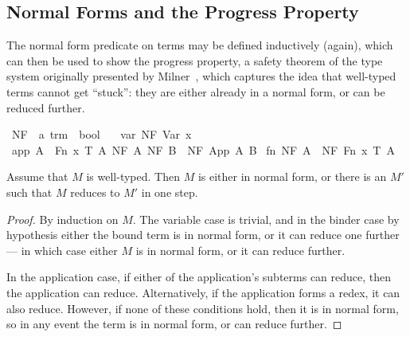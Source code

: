 \subsection{Normal Forms and the Progress Property}
The normal form predicate on terms may be defined inductively (again), which can then be used to show the progress property, a safety theorem of the type system originally presented by Milner~\cite{milner}, which captures the idea that well-typed terms cannot get ``stuck'': they are either already in a normal form, or can be reduced further.

\begin{implementation}
\isamarkupfalse%
\ NF\ {\isacharcolon}{\isacharcolon}\ {\isachardoublequoteopen}{\isacharprime}a\ trm\ {\isasymRightarrow}\ bool{\isachardoublequoteclose}\ \isanewline
\ \ var{\isacharcolon}\ {\isachardoublequoteopen}NF\ {\isacharparenleft}Var\ x{\isacharparenright}{\isachardoublequoteclose}\isanewline
{\isacharbar}\ app{\isacharcolon}\ {\isachardoublequoteopen}{\isasymlbrakk}A\ {\isasymnoteq}\ Fn\ x\ T\ A{\isacharprime}{\isacharsemicolon}\ NF\ A{\isacharsemicolon}\ NF\ B{\isasymrbrakk}\ {\isasymLongrightarrow}\ NF\ {\isacharparenleft}App\ A\ B{\isacharparenright}{\isachardoublequoteclose}\isanewline
{\isacharbar}\ fn{\isacharcolon}\ {\isachardoublequoteopen}NF\ A\ {\isasymLongrightarrow}\ NF\ {\isacharparenleft}Fn\ x\ T\ A{\isacharparenright}{\isachardoublequoteclose}\isanewline
\end{implementation}

\begin{theorem}
\label{theorem:progress}
Assume that \(M\) is well-typed.
Then \(M\) is either in normal form, or there is an \(M'\) such that \(M\) reduces to \(M'\) in one step.
\end{theorem}
\begin{proof}
By induction on \(M\).
The variable case is trivial, and in the binder case by hypothesis either the bound term is in normal form, or it can reduce one further --- in which case either \(M\) is in normal form, or it can reduce further.

In the application case, if either of the application's subterms can reduce, then the application can reduce.
Alternatively, if the application forms a redex, it can also reduce.
However, if none of these conditions hold, then it is in normal form, so in any event the term is in normal form, or can reduce further.
\end{proof}


